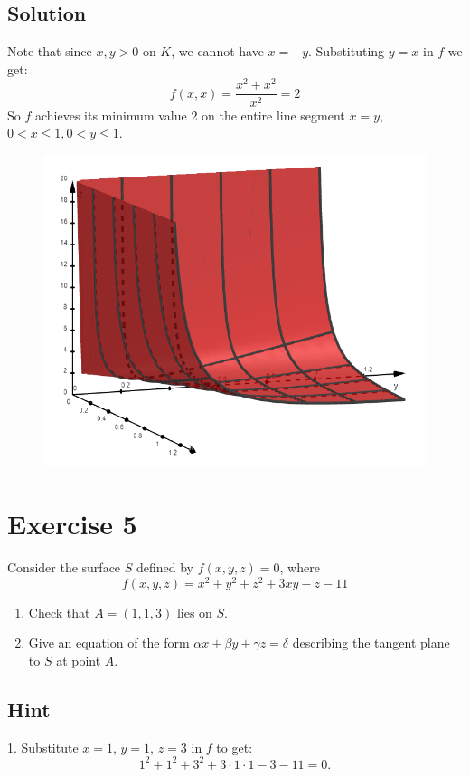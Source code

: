 \documentclass[a4paper,10pt]{article}
\begin{document}
\subsection{Solution}
Note that since $x, y > 0$ on $K$, we cannot have $x = -y$. Substituting $y=x$ in $f$ we get:
\[
    f(x,x) = \frac{x^2 + x^2}{x^2} = 2
\]
So $f$ achieves its minimum value 2 on the entire line segment $x=y$, $0 < x \leq 1, 0 < y \leq 1$.

\begin{figure}[!ht]
    \centering
    \includegraphics[scale=0.5]{ex_4.png}
\end{figure}

\clearpage

\section{Exercise 5}
Consider the surface $S$ defined by $f(x,y,z)=0$, where
\[
    f(x,y,z) = x^2 + y^2 + z^2 + 3xy - z - 11
\]
\begin{enumerate}
    \item Check that $A = (1,1,3)$ lies on $S$.
    \item Give an equation of the form $\alpha x+\beta y+\gamma z=\delta$ describing the tangent plane to $S$ at point $A$.
\end{enumerate}

\subsection{Hint}
1. Substitute $x=1$, $y=1$, $z=3$ in $f$ to get:
\[
    1^2 + 1^2 + 3^2 + 3\cdot 1\cdot 1 - 3 - 11 = 0.
\]
\end{document}
